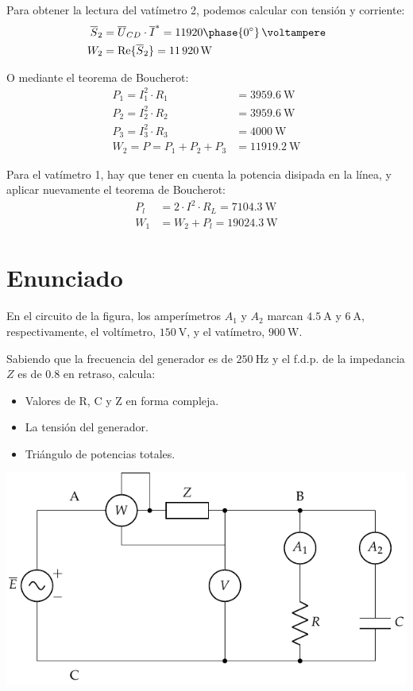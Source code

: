 Para obtener la lectura del vatímetro 2, podemos calcular con tensión y corriente:
  \begin{align*}
\overline{S}_2 &= \overline{U}_{CD} \cdot \overline{I}^* = 11920\phase{\ang{0}}\,\si{\voltampere}\\
%
W_2 &= \mathrm{Re}\{\overline{S}_2\} = \qty{11920}{\watt}
\end{align*}

O mediante el teorema de Boucherot:
\begin{align*}
  P_1 = I_1^2 \cdot R_1 &= \qty{3959.6}{\watt}\\
  P_2 = I_2^2 \cdot R_2 &= \qty{3959.6}{\watt}\\
  P_3 = I_3^2 \cdot R_3 &= \qty{4000}{\watt}\\
  W_2 = P = P_1 + P_2 + P_3 &= \qty{11919.2}{\watt}
\end{align*}

Para el vatímetro 1, hay que tener en cuenta la potencia disipada en la línea, y aplicar nuevamente el teorema de Boucherot:
\begin{align*}
P_l &= 2 \cdot I^2 \cdot R_L = \qty{7104.3}{\watt}\\
W_1 &= W_2 + P_l = \qty{19024.3}{\watt}
\end{align*}



\section{Enunciado}
En el circuito de la figura, los amperímetros $A_1$ y $A_2$ marcan $\qty{4.5}{\ampere}$ y $\qty{6}{\ampere}$, respectivamente, el voltímetro, $\qty{150}{\volt}$, y el
vatímetro, $\qty{900}{\watt}$.

Sabiendo que la frecuencia del generador es de $\qty{250}{\hertz}$ y el f.d.p. de la impedancia $Z$ es de $0.8$ en retraso, calcula:

\begin{itemize}
\item Valores de R, C y Z en forma compleja.
\item La tensión del generador.
\item Triángulo de potencias totales.
\end{itemize}

\begin{center}
  \includegraphics[width=0.6\linewidth]{figuras/BT2_09.pdf}
\end{center}


